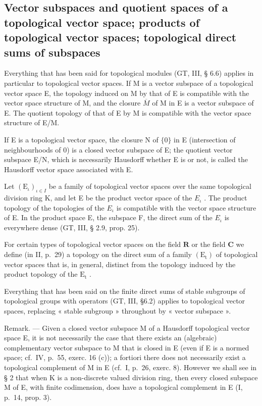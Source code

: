 \subsection{Vector subspaces and quotient spaces of a topological vector space; products of topological vector spaces; topological direct sums of subspaces}

Everything that has been said for topological modules (GT, III, § 6.6) applies in particular to topological vector spaces. If M is a vector subspace of a topological vector space E, the topology induced on M by that of E is compatible with the vector space structure of M, and the closure \(\overline{M}\) of M in E is a vector subspace of E. The quotient topology of that of E by M is compatible with the vector space structure of E/M.

If E is a topological vector space, the closure N of \(\{0\}\) in E (intersection of neighbourhoods of 0) is a closed vector subspace of E; the quotient vector subspace E/N, which is necessarily Hausdorff whether E is or not, is called the Hausdorff vector space associated with E.

Let \((\mathrm{E}_{\iota})_{\iota \in I}\) be a family of topological vector spaces over the same topological division ring K, and let E be the product vector space of the \(E_{\iota}\) . The product topology of the topologies of the \(E_{\iota}\) is compatible with the vector space structure of E. In the product space E, the subspace F, the direct sum of the \(E_{\iota}\) is everywhere dense (GT, III, § 2.9, prop. 25).

For certain types of topological vector spaces on the field \(\mathbf{R}\) or the field \(\mathbf{C}\) we define (in II, p.~29) a topology on the direct sum of a family \((\mathrm{E}_{\mathrm{t}})\) of topological vector spaces that is, in general, distinct from the topology induced by the product topology of the \(\mathrm{E}_{\mathrm{t}}\) .

Everything that has been said on the finite direct sums of stable subgroups of topological groups with operators (GT, III, §6.2) applies to topological vector spaces, replacing « stable subgroup » throughout by « vector subspace ».

Remark. --- Given a closed vector subspace M of a Hausdorff topological vector space E, it is not necessarily the case that there exists an (algebraic) complementary vector subspace to M that is closed in E (even if E is a normed space; cf.~IV, p.~55, exerc. 16 (c)); a fortiori there does not necessarily exist a topological complement of M in E (cf.~I, p.~26, exerc. 8). However we shall see in § 2 that when K is a non-discrete valued division ring, then every closed subspace M of E, with finite codimension, does have a topological complement in E (I, p.~14, prop. 3).

